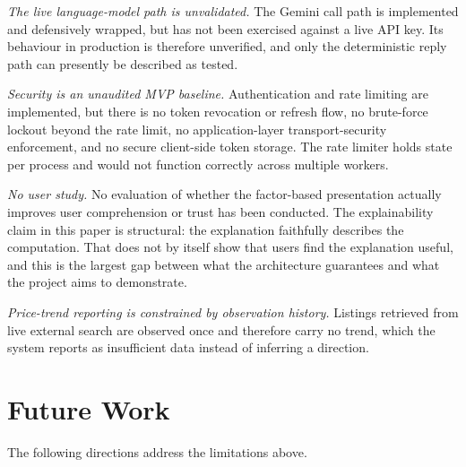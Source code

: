 \documentclass[conference]{IEEEtran}
\begin{document}
\emph{The live language-model path is unvalidated.} The Gemini call path is implemented and defensively wrapped, but has not been exercised against a live API key. Its behaviour in production is therefore unverified, and only the deterministic reply path can presently be described as tested.

\emph{Security is an unaudited MVP baseline.} Authentication and rate limiting are implemented, but there is no token revocation or refresh flow, no brute-force lockout beyond the rate limit, no application-layer transport-security enforcement, and no secure client-side token storage. The rate limiter holds state per process and would not function correctly across multiple workers.

\emph{No user study.} No evaluation of whether the factor-based presentation actually improves user comprehension or trust has been conducted. The explainability claim in this paper is structural: the explanation faithfully describes the computation. That does not by itself show that users find the explanation useful, and this is the largest gap between what the architecture guarantees and what the project aims to demonstrate.

\emph{Price-trend reporting is constrained by observation history.} Listings retrieved from live external search are observed once and therefore carry no trend, which the system reports as insufficient data instead of inferring a direction.

\section{Future Work}

The following directions address the limitations above.
\end{document}
